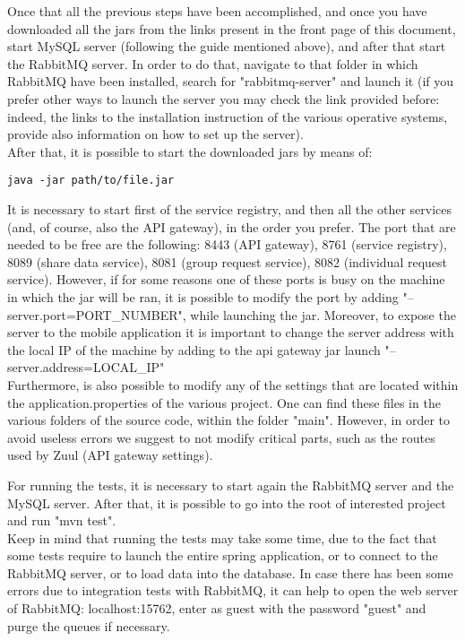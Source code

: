 Once that all the previous steps have been accomplished, and once you have downloaded all the jars from the links present in the front page
of this document, start MySQL server (following the guide mentioned above), and after that start the RabbitMQ server. In order to do that, 
navigate to that folder in which RabbitMQ have been installed, search for "rabbitmq-server" and launch it (if you prefer other ways to launch
the server you may check the link provided before: indeed, the links to the installation instruction of the various operative systems,
provide also information on how to set up the server). \\
After that, it is possible to start the downloaded jars by means of: 
\begin{verbatim}
java -jar path/to/file.jar
\end{verbatim}
It is necessary to start first of the service registry, and then all the other services (and, of course, also the API gateway), in the
order you prefer. 
The port that are needed to be free are the following: 8443 (API gateway), 8761 (service registry), 8089 (share data service), 8081 (group
request service), 8082 (individual request service). However, if for some reasons one of these ports is busy on the
machine in which the jar will be ran, it is possible to modify the port by adding "--server.port=PORT\_NUMBER", while launching the jar. Moreover, to expose the server to the mobile application it is important to change the server address with the local IP of the machine by adding to the api gateway jar launch "--server.address=LOCAL\_IP" \\
Furthermore, is also possible to modify any of the settings that are located within the application.properties of the various project.
One can find these files in the various folders of the source code, within the folder "main". However, in order to avoid useless errors
we suggest to not modify critical parts, such as the routes used by Zuul (API gateway settings). \\

\par 
For running the tests, it is necessary to start again the RabbitMQ server and the MySQL server. After that, it is possible to go into
the root of interested project and run "mvn test". \\
Keep in mind that running the tests may take some time, due to the fact that some tests require to launch the entire spring application,
or to connect to the RabbitMQ server, or to load data into the database. In case there has been some errors due to integration 
tests with RabbitMQ, it can help to open the web server of RabbitMQ: localhost:15762, enter as guest with the password "guest" 
and purge the queues if necessary.

